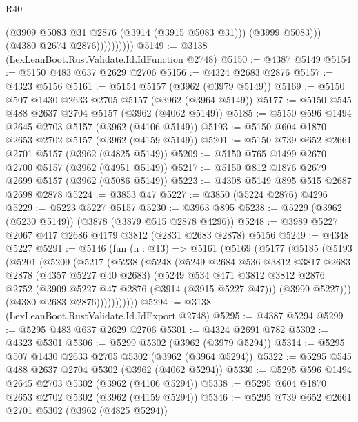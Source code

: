 \begin{lexlean}{R40}
\begin{coremodule}
                          (@3909 @5083 @31 @2876 (@3914 (@3915 @5083 @31)))
                          (@3999 @5083)))
                      (@4380 @2674 @2876))))))))))
@5149 := @3138 (LexLeanBoot.RustValidate.Id.IdFunction @2748)
@5150 := @4387 @5149
@5154 := @5150 @483 @637 @2629 @2706
@5156 := @4324 @2683 @2876
@5157 := @4323 @5156
@5161 := @5154 @5157 (@3962 (@3979 @5149))
@5169 := @5150 @507 @1430 @2633 @2705 @5157 (@3962 (@3964 @5149))
@5177 := @5150 @545 @488 @2637 @2704 @5157 (@3962 (@4062 @5149))
@5185 := @5150 @596 @1494 @2645 @2703 @5157 (@3962 (@4106 @5149))
@5193 := @5150 @604 @1870 @2653 @2702 @5157 (@3962 (@4159 @5149))
@5201 := @5150 @739 @652 @2661 @2701 @5157 (@3962 (@4825 @5149))
@5209 := @5150 @765 @1499 @2670 @2700 @5157 (@3962 (@4951 @5149))
@5217 := @5150 @812 @1876 @2679 @2699 @5157 (@3962 (@5086 @5149))
@5223 := @4308 @5149 @895 @515 @2687 @2698 @2878
@5224 := @3853 @47
@5227 := @3850 (@5224 @2876) @4296
@5229 := @5223 @5227 @5157
@5230 := @3963 @895
@5238 := @5229 (@3962 (@5230 @5149)) (@3878 (@3879 @515 @2878 @4296))
@5248 := @3989 @5227 @2067 @417 @2686 @4179 @3812 (@2831 @2683 @2878) @5156
@5249 := @4348 @5227
@5291 := @5146
    (fun (n : @13) =>
    @5161
      (@5169
        (@5177
          (@5185
            (@5193
              (@5201
                (@5209
                  (@5217
                    (@5238
                      (@5248
                        (@5249
                          @2684
                          @536
                          @3812
                          @3817
                          @2683
                          @2878
                          (@4357 @5227 @40 @2683)
                          (@5249
                            @534
                            @471
                            @3812
                            @3812
                            @2876
                            @2752
                            (@3909 @5227 @47 @2876 (@3914 (@3915 @5227 @47)))
                            (@3999 @5227)))
                        (@4380 @2683 @2876)))))))))))
@5294 := @3138 (LexLeanBoot.RustValidate.Id.IdExport @2748)
@5295 := @4387 @5294
@5299 := @5295 @483 @637 @2629 @2706
@5301 := @4324 @2691 @782
@5302 := @4323 @5301
@5306 := @5299 @5302 (@3962 (@3979 @5294))
@5314 := @5295 @507 @1430 @2633 @2705 @5302 (@3962 (@3964 @5294))
@5322 := @5295 @545 @488 @2637 @2704 @5302 (@3962 (@4062 @5294))
@5330 := @5295 @596 @1494 @2645 @2703 @5302 (@3962 (@4106 @5294))
@5338 := @5295 @604 @1870 @2653 @2702 @5302 (@3962 (@4159 @5294))
@5346 := @5295 @739 @652 @2661 @2701 @5302 (@3962 (@4825 @5294))

\end{coremodule}
\end{lexlean}
